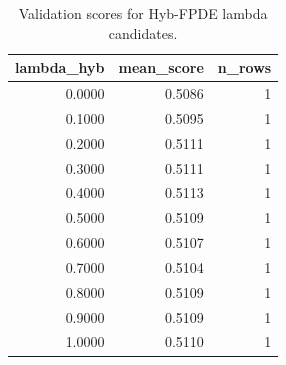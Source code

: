 \begin{table}[t]
\caption{Validation scores for Hyb-FPDE lambda candidates.}
\label{tab:lambda_distribution_computed}
\centering
\begin{tabular}{rrr}
\toprule
lambda\_hyb & mean\_score & n\_rows \\
\midrule
0.0000 & 0.5086 & 1 \\
0.1000 & 0.5095 & 1 \\
0.2000 & 0.5111 & 1 \\
0.3000 & 0.5111 & 1 \\
0.4000 & 0.5113 & 1 \\
0.5000 & 0.5109 & 1 \\
0.6000 & 0.5107 & 1 \\
0.7000 & 0.5104 & 1 \\
0.8000 & 0.5109 & 1 \\
0.9000 & 0.5109 & 1 \\
1.0000 & 0.5110 & 1 \\
\bottomrule
\end{tabular}

\end{table}
